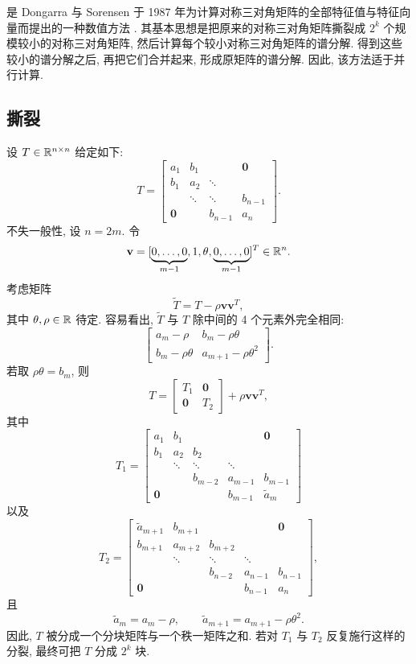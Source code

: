 是 Dongarra 与 Sorensen 于 1987 年为计算对称三对角矩阵的全部特征值与特征向量而提出的一种数值方法 \cite{src:32}. 其基本思想是把原来的对称三对角矩阵撕裂成 $2^k$ 个规模较小的对称三对角矩阵, 然后计算每个较小对称三对角矩阵的谱分解. 得到这些较小的谱分解之后, 再把它们合并起来, 形成原矩阵的谱分解. 因此, 该方法适于并行计算.

\subsection{撕裂}
\label{sec:8-5-1}

设 $T\in\mathbb{R}^{n\times n}$ 给定如下:
\[
  T=\begin{bmatrix}
    a_1 & b_1 & & \mathbf{0}\\
    b_1 & a_2 & \ddots & \\
     & \ddots & \ddots & b_{n-1}\\
    \mathbf{0} & & b_{n-1} & a_n
  \end{bmatrix}.
\]
不失一般性, 设 $n=2m$. 令
\[
  \mathbf{v}=[\underbrace{0,\ldots,0}_{m-1},1,\theta,
  \underbrace{0,\ldots,0}_{m-1}]^T\in\mathbb{R}^n.
\]
考虑矩阵
\[
  \tilde{T}=T-\rho\mathbf{v}\mathbf{v}^T,
\]
其中 $\theta,\rho\in\mathbb{R}$ 待定. 容易看出, $\tilde{T}$ 与 $T$ 除中间的 4 个元素外完全相同:
\[
  \begin{bmatrix}
    a_m-\rho & b_m-\rho\theta\\
    b_m-\rho\theta & a_{m+1}-\rho\theta^2
  \end{bmatrix}.
\]
若取 $\rho\theta=b_m$, 则
\[
  T=\begin{bmatrix}
    T_1 & \mathbf{0}\\
    \mathbf{0} & T_2
  \end{bmatrix}+\rho\mathbf{v}\mathbf{v}^T,
\]
其中
\[
  T_1=\begin{bmatrix}
    a_1 & b_1 & & & \mathbf{0}\\
    b_1 & a_2 & b_2 & & \\
     & \ddots & \ddots & \ddots & \\
     & & b_{m-2} & a_{m-1} & b_{m-1}\\
    \mathbf{0} & & & b_{m-1} & \tilde{a}_m
  \end{bmatrix}
\]
以及
\[
  T_2=\begin{bmatrix}
    \tilde{a}_{m+1} & b_{m+1} & & & \mathbf{0}\\
    b_{m+1} & a_{m+2} & b_{m+2} & & \\
     & \ddots & \ddots & \ddots & \\
     & & b_{n-2} & a_{n-1} & b_{n-1}\\
    \mathbf{0} & & & b_{n-1} & a_n
  \end{bmatrix},
\]
且
\[
  \tilde{a}_m=a_m-\rho,
  \qquad
  \tilde{a}_{m+1}=a_{m+1}-\rho\theta^2.
\]
因此, $T$ 被分成一个分块矩阵与一个秩一矩阵之和. 若对 $T_1$ 与 $T_2$ 反复施行这样的分裂, 最终可把 $T$ 分成 $2^k$ 块.

